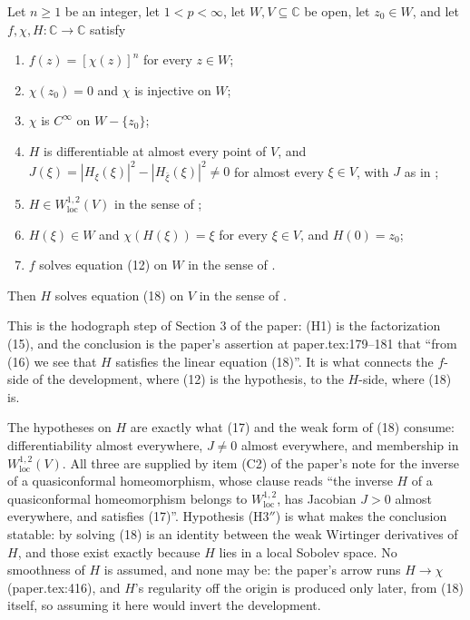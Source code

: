 \begin{lemma}
Let $n\ge1$ be an integer, let $1<p<\infty$, let $W,V\subseteq\mathbb{C}$ be
open, let $z_0\in W$, and let $f,\chi,H\colon\mathbb{C}\to\mathbb{C}$ satisfy
\begin{enumerate}
\item[(H1)] $f(z)=[\chi(z)]^{n}$ for every $z\in W$;
\item[(H2)] $\chi(z_0)=0$ and $\chi$ is injective on $W$;
\item[(H3)] $\chi$ is $C^\infty$ on $W-\{z_0\}$;
\item[(H3$'$)] $H$ is differentiable at almost every point of $V$, and
  $J(\xi)=|H_\xi(\xi)|^2-|H_{\bar\xi}(\xi)|^2\neq0$ for almost every
  $\xi\in V$, with $J$ as in ;
\item[(H3$''$)] $H\in W^{1,2}_{\mathrm{loc}}(V)$ in the sense of
  ;
\item[(H4)] $H(\xi)\in W$ and $\chi(H(\xi))=\xi$ for every $\xi\in V$, and
  $H(0)=z_0$;
\item[(H5)] $f$ solves equation (12) on $W$ in the sense of
  .
\end{enumerate}
Then $H$ solves equation (18) on $V$ in the sense of .

This is the hodograph step of Section 3 of the paper: (H1) is the
factorization (15), and the conclusion is the paper's assertion at
paper.tex:179--181 that ``from (16) we see that $H$ satisfies the linear
equation (18)''.  It is what connects the $f$-side of the development, where
(12) is the hypothesis, to the $H$-side, where (18) is.

The hypotheses on $H$ are exactly what (17) and the weak form of (18)
consume: differentiability almost everywhere, $J\neq0$ almost everywhere, and
membership in $W^{1,2}_{\mathrm{loc}}(V)$.  All three are supplied by item
(C2) of the paper's note for the inverse of a quasiconformal homeomorphism,
whose clause reads ``the inverse $H$ of a quasiconformal homeomorphism belongs
to $W^{1,2}_{\mathrm{loc}}$, has Jacobian $J>0$ almost everywhere, and
satisfies (17)''.  Hypothesis (H3$''$) is what makes the conclusion statable:
by  solving (18) is an identity between the weak Wirtinger
derivatives of $H$, and those exist exactly because $H$ lies in a local
Sobolev space.  No smoothness of $H$ is assumed, and none may be: the paper's
arrow runs $H\to\chi$ (paper.tex:416), and $H$'s regularity off the origin is
produced only later, from (18) itself, so assuming it here would invert the
development.
\end{lemma}
